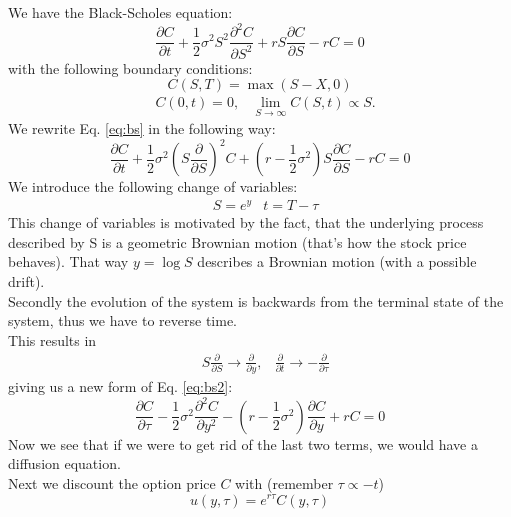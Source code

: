 \documentclass[11pt]{article}
\begin{document}
We have the Black-Scholes equation:
\begin{equation}
    \frac{\partial C}{\partial t} + \frac{1}{2} \sigma^2 S^2 \frac{\partial^2 C}{\partial S^2} + rS \frac{\partial C}{\partial S} - rC = 0
    \label{eq:bs}
\end{equation}
with the following boundary conditions:
\begin{equation}
    C(S,T)=\max(S-X,0) \tag{1}
    \label{eq:cond1}
\end{equation}
\begin{align}
    & C(0,t)=0,
    & \lim_{S\to\infty}C(S,t)\propto S.
    \label{eq:boundaryconditions}
\end{align}
We rewrite Eq. \ref{eq:bs} in the following way:
\begin{equation}
    \frac{\partial C}{\partial t} + \frac{1}{2} \sigma ^2 (S \frac{\partial}{\partial S})^2 C + (r - \frac{1}{2}\sigma^2) S \frac{\partial C}{\partial S} - rC = 0
    \label{eq:bs2}
\end{equation}
We introduce the following change of variables:
\begin{align}
    & S = e^y
    & t = T - \tau
\end{align}
This change of variables is motivated by the fact, that the underlying process described by S is a geometric Brownian motion (that's how the stock price behaves). That way $y=\log{S}$ describes a Brownian motion (with a possible drift).\\
Secondly the evolution of the system is backwards from the terminal state of the system, thus we have to reverse time.\\
This results in
\begin{align}
    &S \frac{\partial}{\partial S} \rightarrow \frac{\partial}{\partial y},
    & \frac{\partial}{\partial t} \rightarrow - \frac{\partial}{\partial \tau}
\end{align}
giving us a new form of Eq. \ref{eq:bs2}:
\begin{equation}
    \frac{\partial C}{\partial \tau} - \frac{1}{2} \sigma ^2 \frac{\partial^2 C}{\partial y^2} - (r - \frac{1}{2}\sigma^2) \frac{\partial C}{\partial y} + rC = 0
    \label{eq:bs3}
\end{equation}
Now we see that if we were to get rid of the last two terms, we would have a diffusion equation.\\
Next we discount the option price $C$ with (remember $\tau \propto -t$)
\begin{equation}
    u(y,\tau) = e^{r\tau} C(y,\tau)
    \label{eq:subu}
\end{equation}
\end{document}
